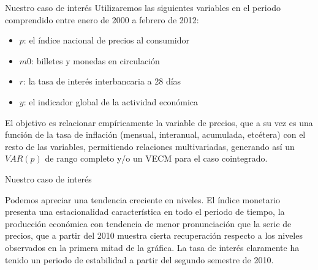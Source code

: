 \documentclass{beamer}
\newcommand{\?}{?`}
\begin{document}
\begin{frame}{Nuestro caso de inter\'es}
  Utilizaremos las siguientes variables en el periodo comprendido
  entre enero de 2000 a febrero de 2012:
  \begin{itemize}
    \item $p$: el \'indice nacional de precios al consumidor
    \item $m0$: billetes y monedas en circulaci\'on
    \item $r$: la tasa de inter\'es interbancaria a 28 d\'ias
    \item $y$: el indicador global de la actividad econ\'omica
  \end{itemize}
  El objetivo es relacionar emp\'iricamente la variable de precios,
  que a su vez es una funci\'on de la tasa de inflaci\'on (mensual,
  interanual, acumulada, etc\'etera) con el resto de las variables,
  permitiendo relaciones multivariadas, generando as\'i un $VAR(p)$ de
  rango completo y/o un VECM para el caso cointegrado.
\end{frame}

\begin{frame}{Nuestro caso de inter\'es}
  \begin{figure}[htbp]
\end{figure}
\begin{footnotesize}
  Podemos apreciar una tendencia creciente en niveles. El \'indice
  monetario presenta una estacionalidad caracter\'istica en todo el
  periodo de tiempo, la producci\'on econ\'omica con tendencia de menor
  pronunciaci\'on que la serie de precios, que a partir del 2010 muestra
  cierta recuperaci\'on respecto a los niveles observados en la primera
  mitad de la gr\'afica. La tasa de inter\'es claramente ha tenido un
  periodo de estabilidad a partir del segundo semestre de 2010.
\end{footnotesize}
\end{frame}
\end{document}
